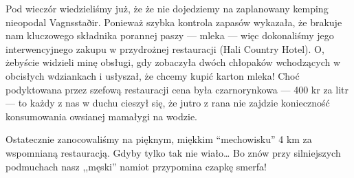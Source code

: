 Pod wieczór wiedzieliśmy już, że że nie dojedziemy na zaplanowany kemping nieopodal Vagnsstaðir. Ponieważ szybka kontrola zapasów wykazała, że brakuje nam kluczowego składnika porannej paszy --- mleka --- więc dokonaliśmy jego interwencyjnego zakupu w przydrożnej restauracji (Hali Country Hotel). O, żebyście widzieli minę obsługi, gdy zobaczyła dwóch chłopaków wchodzących w obcisłych wdziankach i usłyszał, że chcemy kupić karton mleka! Choć podyktowana przez szefową restauracji cena była czarnorynkowa --- 400 kr za litr --- to każdy z nas w duchu cieszył się, że jutro z rana nie zajdzie konieczność konsumowania owsianej mamałygi na wodzie.

Ostatecznie zanocowaliśmy na pięknym, miękkim “mechowisku” 4 km za wspomnianą restauracją. Gdyby tylko tak nie wiało… Bo znów przy silniejszych podmuchach nasz ,,męski'' namiot przypomina czapkę smerfa!